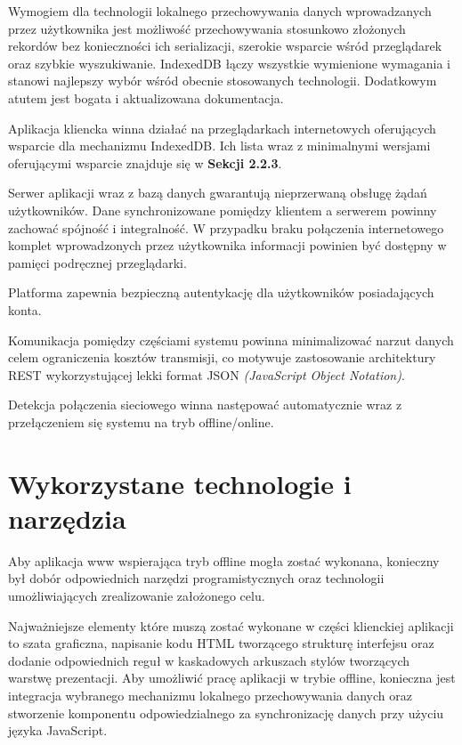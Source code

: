 Wymogiem dla technologii lokalnego przechowywania danych wprowadzanych przez użytkownika jest możliwość przechowywania stosunkowo złożonych rekordów bez konieczności ich serializacji, szerokie wsparcie wśród przeglądarek oraz szybkie wyszukiwanie. IndexedDB łączy wszystkie wymienione wymagania i stanowi najlepszy wybór wśród obecnie stosowanych technologii. Dodatkowym atutem jest bogata i aktualizowana dokumentacja.

Aplikacja kliencka winna działać na przeglądarkach internetowych oferujących wsparcie dla mechanizmu IndexedDB. Ich lista wraz z minimalnymi wersjami oferującymi wsparcie znajduje się w \textbf{Sekcji 2.2.3}.

Serwer aplikacji wraz z bazą danych gwarantują nieprzerwaną obsługę żądań użytkowników. Dane synchronizowane pomiędzy klientem a serwerem powinny zachować spójność i integralność. W przypadku braku połączenia internetowego komplet wprowadzonych przez użytkownika informacji powinien być dostępny w pamięci podręcznej przeglądarki.

Platforma zapewnia bezpieczną autentykację dla użytkowników posiadających konta.

Komunikacja pomiędzy częściami systemu powinna minimalizować narzut danych celem ograniczenia kosztów transmisji, co motywuje zastosowanie architektury REST wykorzystującej lekki format JSON \emph{(JavaScript Object Notation)}.

Detekcja połączenia sieciowego winna następować automatycznie wraz z przełączeniem się systemu na tryb offline/online.

\section{Wykorzystane technologie i narzędzia}
\label{sec:wykoTechnINarz}

Aby aplikacja www wspierająca tryb offline mogła zostać wykonana, konieczny był dobór odpowiednich narzędzi programistycznych oraz technologii umożliwiających zrealizowanie założonego celu.

Najważniejsze elementy które muszą zostać wykonane w części klienckiej aplikacji to szata graficzna, napisanie kodu HTML tworzącego strukturę interfejsu oraz dodanie odpowiednich reguł w kaskadowych arkuszach stylów tworzących warstwę prezentacji. Aby umożliwić pracę aplikacji w trybie offline, konieczna jest integracja wybranego mechanizmu lokalnego przechowywania danych oraz stworzenie komponentu odpowiedzialnego za synchronizację danych przy użyciu języka JavaScript.

